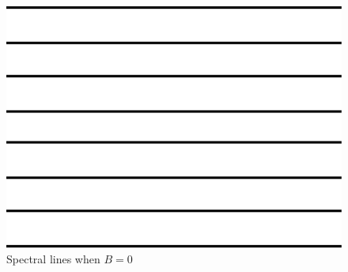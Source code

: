 \documentclass[a4paper,12pt]{article}
\begin{document}
\begin{figure}[h!]
	\centering
	\includegraphics[scale = 0.8]{b0}
	\caption{Spectral lines when $B=0$}
	\label{fig:b0}
\end{figure}
\end{document}

